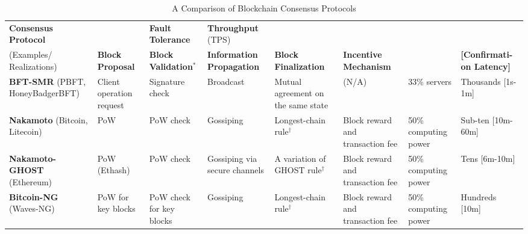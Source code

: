 \label{sec:comparison}
\begin{table}
    \caption{A Comparison of Blockchain Consensus Protocols}
    \small
    \renewcommand{\arraystretch}{1.1}
    \begin{tabular}{
        |>{\raggedright}p{.9in}|
        |>{\raggedright}p{.67in}
        |>{\raggedright}p{.7in}
        |>{\raggedright}p{.7in}
        |>{\raggedright}p{.75in}
        |>{\raggedright}p{.75in}|
        |>{\raggedright}p{.57in}
        |p{.65in}|
        }
        \hline
        \textbf{Consensus \hspace{.5in} Protocol} & \multicolumn{5}{c||}{\textbf{Five-Component Framework}} & \textbf{Fault \hspace{.5in} Tolerance} & \textbf{Throughput} (TPS)  \\ \cline{2-6}
         (Examples/ Realizations) & \textbf{Block Proposal} & \textbf{Block Validation$^*$} & \textbf{Information Propagation} & \textbf{Block \hspace{.5in} Finalization} & \textbf{Incentive Mechanism} & & \textbf{\color{\rcolor}[Confirmati- on Latency]} \\ \hline \hline
         \textcolor{\rcolor}{\textbf{BFT-SMR}} \hspace{1in} (PBFT, HoneyBadgerBFT)
         & Client operation request & Signature check & Broadcast & Mutual agreement on the same state & (N/A) & 33\% servers & Thousands \hspace{1in} {\color{\rcolor}[1s-1m]} \\ \hline
         \textbf{Nakamoto} \hspace{.5in} (Bitcoin, Litecoin) & PoW & PoW check & Gossiping & Longest-chain rule$^\dagger$ & Block reward and transaction fee & 50\% computing power & Sub-ten \hspace{1in} {\color{\rcolor}[10m-60m]} \\ \hline
         \textbf{Nakamoto-GHOST} \hspace{.5in} (Ethereum) & PoW (Ethash) & PoW check & Gossiping \hspace{1in}via secure channels & A variation of GHOST rule$^\dagger$ & Block reward and transaction fee & 50\% computing power & Tens \hspace{1in} {\color{\rcolor}[6m-10m]} \\ \hline
         \textbf{Bitcoin-NG} \hspace{.5in} (Waves-NG) & PoW for key blocks & PoW check for key blocks & Gossiping & Longest-chain rule$^\dagger$ & Block reward and transaction fee & 50\% computing power & Hundreds \hspace{1in} {\color{\rcolor}[10m]} \\ \hline

\end{tabular}
\end{table}
